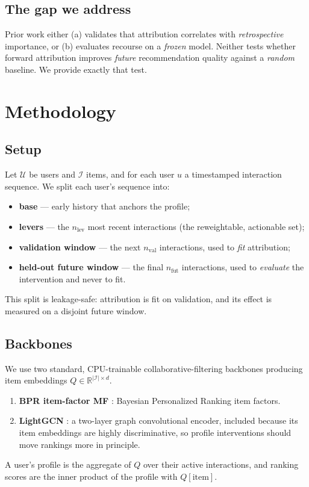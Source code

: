 \documentclass[pdflatex,sn-mathphys-num]{sn-jnl}%
\theoremstyle{thmstyleone}%
\theoremstyle{thmstyletwo}%
\theoremstyle{thmstylethree}%
\newcommand{\Uset}{\mathcal{U}}
\newcommand{\Iset}{\mathcal{I}}
\begin{document}
\subsection{The gap we address}

Prior work either (a) validates that attribution correlates with \emph{retrospective} importance, or (b) evaluates recourse on a \emph{frozen} model. Neither tests whether forward attribution improves \emph{future} recommendation quality against a \emph{random} baseline. We provide exactly that test.

\section{Methodology}\label{sec3}

\subsection{Setup}

Let $\Uset$ be users and $\Iset$ items, and for each user $u$ a timestamped interaction sequence. We split each user's sequence into:
\begin{itemize}
\item \textbf{base} --- early history that anchors the profile;
\item \textbf{levers} --- the $n_{\mathrm{lev}}$ most recent interactions (the reweightable, actionable set);
\item \textbf{validation window} --- the next $n_{\mathrm{val}}$ interactions, used to \emph{fit} attribution;
\item \textbf{held-out future window} --- the final $n_{\mathrm{fut}}$ interactions, used to \emph{evaluate} the intervention and never to fit.
\end{itemize}
This split is leakage-safe: attribution is fit on validation, and its effect is measured on a disjoint future window.

\subsection{Backbones}

We use two standard, CPU-trainable collaborative-filtering backbones producing item embeddings $Q\in\mathbb{R}^{|\Iset|\times d}$.
\begin{enumerate}
\item \textbf{BPR item-factor MF} \cite{rendle2009bpr}: Bayesian Personalized Ranking item factors.
\item \textbf{LightGCN} \cite{he2020lightgcn}: a two-layer graph convolutional encoder, included because its item embeddings are highly discriminative, so profile interventions should move rankings more in principle.
\end{enumerate}
A user's profile is the aggregate of $Q$ over their active interactions, and ranking scores are the inner product of the profile with $Q[\text{item}]$.
\end{document}
